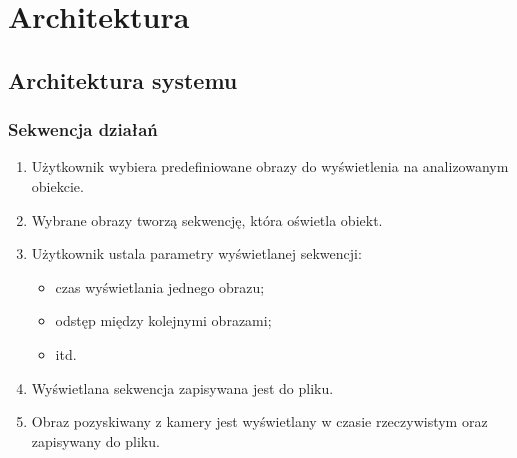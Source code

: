 \documentclass{beamer}
\begin{document}
\section{Architektura}
\subsection{Architektura systemu}
\begin{frame}\frametitle{Sekwencja działań}
      \begin{enumerate}
       \item Użytkownik wybiera predefiniowane obrazy do wyświetlenia na analizowanym obiekcie.\pause
       \item Wybrane obrazy tworzą sekwencję, która oświetla obiekt.\pause
       \item Użytkownik ustala parametry wyświetlanej sekwencji: 
       \begin{itemize}
        \item czas wyświetlania jednego obrazu;
        \item odstęp między kolejnymi obrazami;
        \item itd.
       \end{itemize} \pause
       \item Wyświetlana sekwencja zapisywana jest do pliku.\pause
       \item Obraz pozyskiwany z kamery jest wyświetlany w czasie rzeczywistym oraz zapisywany do pliku.
      \end{enumerate}
\end{frame}
\end{document}
